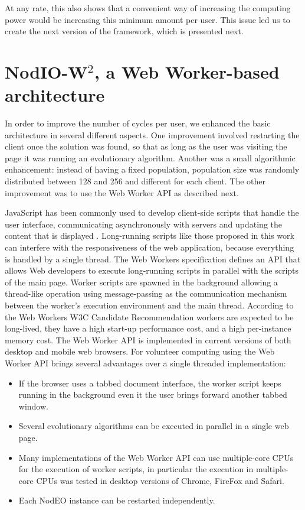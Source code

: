 \documentclass[journal,onecolumn]{IEEEtran}
\begin{document}
At any rate, this also shows that a convenient way of increasing the
computing power would be increasing this minimum amount per user. This
issue led us to create the next version of the framework, which is
presented next. %

\section{{\sf NodIO-W$^2$}, a Web Worker-based architecture}
\label{sec:w2}

In order to improve the number of cycles per user, we enhanced the
basic architecture in several different aspects.  One improvement 
involved restarting the client once the solution was
found, so that as long as the user was visiting the page it was
running an evolutionary algorithm. Another was a small algorithmic
enhancement: instead of having a fixed population,
population size was randomly distributed between 128 and 256 and
different for each client.  The other improvement was to 
use the Web Worker API as described next.

JavaScript has been commonly used to develop client-side scripts
that handle the user interface, communicating asynchronously with servers and
updating the content that is displayed \cite{flanagan2006javascript}.
Long-running scripts like those proposed in this work can interfere with the
responsiveness of the web application, because everything is handled by a
single thread. The Web Workers specification \cite{hickson2012web} defines an
API that allows Web developers to execute long-running scripts in parallel
with the scripts of the main page. Worker scripts are spawned in the
background allowing a thread-like operation using message-passing as the
communication mechanism between the worker's execution environment and the
main thread. According to the Web Workers W3C Candidate Recommendation
\cite{hickson2012web} workers are expected to be long-lived, they have a high
start-up performance cost, and a high per-instance memory cost. The Web Worker
API is implemented in current versions of both desktop and mobile web browsers.
For volunteer computing using the Web Worker API brings several advantages
over a single threaded implementation:

\begin{itemize}
\item If the browser uses a tabbed document interface, the worker script
keeps running in the background even it the user brings forward another tabbed
window.
\item Several evolutionary algorithms can be executed in parallel in a single web
page. 
\item Many implementations of the Web Worker API can use multiple-core CPUs for
the execution of worker scripts, in particular the execution in multiple-core CPUs
was tested in desktop versions of Chrome, FireFox and Safari.
\item Each {\sf NodEO} instance can be restarted independently.
\end{itemize}
\end{document}
